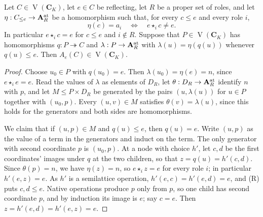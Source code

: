 \begin{lemma}\label{core:lem:typed-upper-clone-cover}
Let $C\in\operatorname V(\mathbf C_K)$, let $e\in C$ be reflecting, let
$R$ be a proper set of roles, and let
$\eta:C_{\leq e}\to\mathbf A_R^{\rm at}$ be a homomorphism such that, for
every $c\leq e$ and every role $i$,
\[
 \eta(c)=a_i\quad\Longleftrightarrow\quad e\star_i c\ne e.
\]
In particular $e\star_i c=e$ for $c\leq e$ and $i\notin R$.
Suppose that $P\in\operatorname V(\mathbf C_K)$ has homomorphisms
$q:P\twoheadrightarrow C$ and $\lambda:P\to\mathbf A_R^{\rm at}$ with
$\lambda(u)=\eta(q(u))$ whenever $q(u)\leq e$. Then
$A_e(C)\in\operatorname V(\mathbf C_K)$.
\end{lemma}
\begin{proof}
Choose $u_0\in P$ with $q(u_0)=e$. Then $\lambda(u_0)=\eta(e)=n$, since
$e\star_ie=e$. Read the values of $\lambda$ as elements of $D_R$, let
$\theta:D_R\to\mathbf A_R^{\rm at}$ identify $n$ with $p$, and let
$M\leq P\times D_R$ be generated by the pairs $(u,\lambda(u))$ for
$u\in P$ together with $(u_0,p)$. Every $(u,v)\in M$ satisfies
$\theta(v)=\lambda(u)$, since this holds for the generators and both sides
are homomorphisms.

We claim that if $(u,p)\in M$ and $q(u)\leq e$, then $q(u)=e$. Write
$(u,p)$ as the value of a term in the generators and induct on the term.
The only generator with second coordinate $p$ is $(u_0,p)$. At a node with
choice $h'$, let $c,d$ be the first coordinates' images under $q$ at the two
children, so that $z=q(u)=h'(c,d)$. Since $\theta(p)=n$, we have
$\eta(z)=n$, so $e\star_iz=e$ for every role $i$; in particular
$h'(e,z)=e$. As $h'$ is a semilattice operation, $h'(e,c)=h'(e,d)=e$, and
(R) puts $c,d\leq e$. Native operations produce $p$ only from $p$, so one
child has second coordinate $p$, and by induction its image is $e$; say
$c=e$. Then $z=h'(e,d)=h'(e,z)=e$.


\end{proof}
